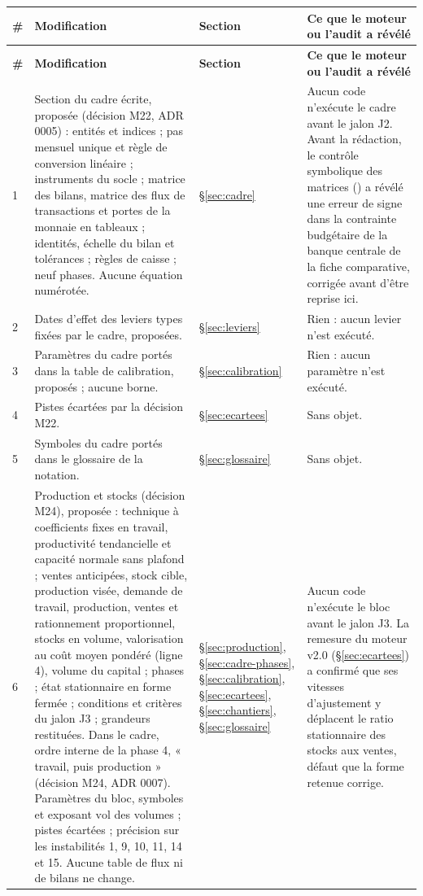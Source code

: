 \documentclass[11pt,a4paper]{article}
\newcommand{\code}[1]{\texttt{\detokenize{#1}}}
\begin{document}
\begin{center}\small
\begin{longtable}{p{0.5cm}>{\raggedright\arraybackslash}p{6.3cm}>{\raggedright\arraybackslash}p{2.1cm}>{\raggedright\arraybackslash}p{5.8cm}}
\toprule
\textbf{\#} & \textbf{Modification} & \textbf{Section} & \textbf{Ce que le moteur ou l'audit a révélé}\\
\midrule
\endfirsthead
\toprule
\textbf{\#} & \textbf{Modification} & \textbf{Section} & \textbf{Ce que le moteur ou l'audit a révélé}\\
\midrule
\endhead
1 & Section du cadre écrite, proposée (décision M22, ADR 0005) : entités et indices ; pas mensuel unique et règle de conversion linéaire ; instruments du socle ; matrice des bilans, matrice des flux de transactions et portes de la monnaie en tableaux ; identités, échelle du bilan et tolérances ; règles de caisse ; neuf phases. Aucune équation numérotée. & \S\ref{sec:cadre} & Aucun code n'exécute le cadre avant le jalon J2. Avant la rédaction, le contrôle symbolique des matrices (\code{outils/verifier_matrices.py}) a révélé une erreur de signe dans la contrainte budgétaire de la banque centrale de la fiche comparative, corrigée avant d'être reprise ici.\\
2 & Dates d'effet des leviers types fixées par le cadre, proposées. & \S\ref{sec:leviers} & Rien : aucun levier n'est exécuté.\\
3 & Paramètres du cadre portés dans la table de calibration, proposés ; aucune borne. & \S\ref{sec:calibration} & Rien : aucun paramètre n'est exécuté.\\
4 & Pistes écartées par la décision M22. & \S\ref{sec:ecartees} & Sans objet.\\
5 & Symboles du cadre portés dans le glossaire de la notation. & \S\ref{sec:glossaire} & Sans objet.\\
6 & Production et stocks (décision M24), proposée : technique à coefficients fixes en travail, productivité tendancielle et capacité normale sans plafond ; ventes anticipées, stock cible, production visée, demande de travail, production, ventes et rationnement proportionnel, stocks en volume, valorisation au coût moyen pondéré (ligne 4), volume du capital ; phases ; état stationnaire en forme fermée ; conditions et critères du jalon J3 ; grandeurs restituées. Dans le cadre, ordre interne de la phase 4, « travail, puis production » (décision M24, ADR 0007). Paramètres du bloc, symboles et exposant $\mathrm{vol}$ des volumes ; pistes écartées ; précision sur les instabilités 1, 9, 10, 11, 14 et 15. Aucune table de flux ni de bilans ne change. & \S\ref{sec:production}, \S\ref{sec:cadre-phases}, \S\ref{sec:calibration}, \S\ref{sec:ecartees}, \S\ref{sec:chantiers}, \S\ref{sec:glossaire} & Aucun code n'exécute le bloc avant le jalon J3. La remesure du moteur v2.0 (\S\ref{sec:ecartees}) a confirmé que ses vitesses d'ajustement y déplacent le ratio stationnaire des stocks aux ventes, défaut que la forme retenue corrige.\\

\end{longtable}
\end{center}
\end{document}
